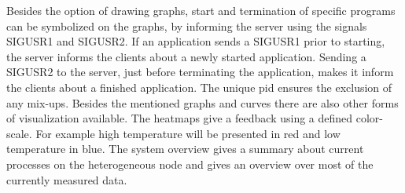 Besides the option of drawing graphs, start and termination of specific programs can be symbolized on the graphs, by informing the server using the signals SIGUSR1 and SIGUSR2. If an application sends a SIGUSR1 prior to starting, the server informs the clients about a newly started application. Sending a SIGUSR2 to the server, just before terminating the application, makes it inform the clients about a finished application. The unique pid ensures the exclusion of any mix-ups.\newline
Besides the mentioned graphs and curves there are also other forms of visualization available. The heatmaps give a feedback using a defined color-scale. For example high temperature will be presented in red and low temperature in blue.\newline
The system overview gives a summary about current processes on the heterogeneous node and gives an overview over most of the currently measured data.  



